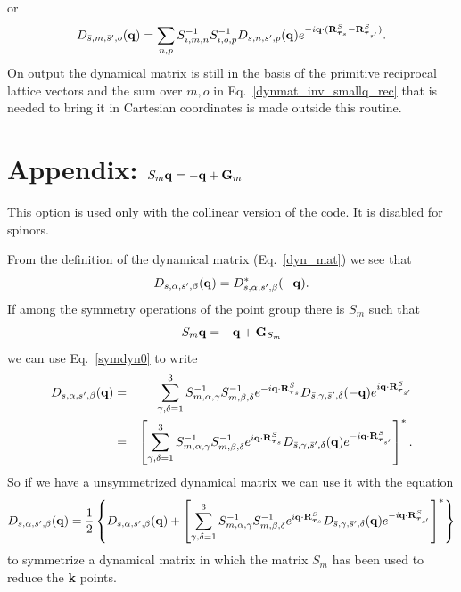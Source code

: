\documentclass[12pt,a4paper,twoside]{report}
\begin{document}
or
\begin{equation}
D_{\bar s,m,\bar s',o}({\bf q}) =
\sum_{n,p}  S^{-1}_{i,m,n}    S^{-1}_{i,o,p} 
D_{s,n,s',p}({\bf q})
e^{-i {\bf q} \cdot ({\bf R}^{S}_{\boldsymbol{\tau}_s} - {\bf R}^{S}_{\boldsymbol{\tau}_{s'}})}.
\end{equation}
On output the dynamical matrix is still in the basis of the primitive reciprocal lattice vectors and the sum over $m,o$ in Eq.~\ref{dynmat_inv_smallq_rec} that is needed to bring it in Cartesian coordinates is made outside this routine.

\section{Appendix: $S_{m} {\bf q} = -{\bf q} + {\bf G}_m$ }

This option is used only with the collinear version of the code. It is disabled for spinors.

From the definition of the dynamical matrix
(Eq.~\ref{dyn_mat}) we see that
\begin{equation}
D_{s,\alpha,s',\beta}({\bf q}) =
D^*_{s,\alpha,s',\beta}(-{\bf q}).
\end{equation}
If among the symmetry operations of the point group there is $S_m$ such that
\begin{equation}
S_{m} {\bf q} = -{\bf q} + {\bf G}_{S_m}
\label{sminusq}
\end{equation}
we can use Eq.~\ref{symdyn0} to write
\begin{eqnarray}
D_{s,\alpha,s',\beta}({\bf q}) &=&
\sum_{\gamma,\delta=1}^3  S^{-1}_{m,\alpha,\gamma} S^{-1}_{m,\beta,\delta}
e^{-i {\bf q} \cdot {\bf R}^{S}_{\boldsymbol{\tau}_s} }
D_{\bar s,\gamma,\bar s',\delta}(-{\bf q})
e^{i {\bf q} \cdot {\bf R}^{S}_{\boldsymbol{\tau}_{s'}}} \nonumber \\
&=&
\left[ \sum_{\gamma,\delta=1}^3  S^{-1}_{m,\alpha,\gamma} S^{-1}_{m,\beta,\delta}
e^{i {\bf q} \cdot {\bf R}^{S}_{\boldsymbol{\tau}_s} }
D_{\bar s,\gamma,\bar s',\delta}({\bf q})
e^{-i {\bf q} \cdot {\bf R}^{S}_{\boldsymbol{\tau}_{s'}}} 
\right]^*.
\label{symdyn0_mq}
\end{eqnarray}
So if we have a unsymmetrized dynamical matrix we can use it with the equation
\begin{equation}
D_{s,\alpha,s',\beta}({\bf q})=
{1\over 2}
\left\{D_{s,\alpha,s',\beta}({\bf q}) +
\left[\sum_{\gamma,\delta=1}^3  S^{-1}_{m,\alpha,\gamma} S^{-1}_{m,\beta,\delta}
e^{i {\bf q} \cdot {\bf R}^{S}_{\boldsymbol{\tau}_s} }
D_{\bar s,\gamma,\bar s',\delta}({\bf q})
e^{-i {\bf q} \cdot {\bf R}^{S}_{\boldsymbol{\tau}_{s'}}} 
\right]^* \right\}
\end{equation}
to symmetrize a dynamical matrix in which the
matrix $S_m$ has been used to reduce the {\bf k} points.
\end{document}
